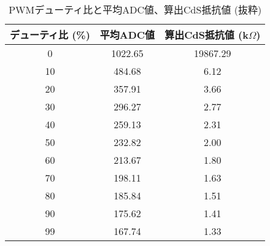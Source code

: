 \documentclass[a4paper,11pt,dvipdfmx]{jsarticle}
\begin{document}
\begin{table}[h!]
\centering
\caption{PWMデューティ比と平均ADC値、算出CdS抵抗値 (抜粋)}
\label{tab:results_excerpt}
\begin{tabular}{@{}ccc@{}}
\toprule
デューティ比 (\%) & 平均ADC値 & 算出CdS抵抗値 (k$\Omega$) \\ \midrule
0 & 1022.65 & 19867.29 \\
10 & 484.68 & 6.12 \\
20 & 357.91 & 3.66 \\
30 & 296.27 & 2.77 \\
40 & 259.13 & 2.31 \\
50 & 232.82 & 2.00 \\
60 & 213.67 & 1.80 \\
70 & 198.11 & 1.63 \\
80 & 185.84 & 1.51 \\
90 & 175.62 & 1.41 \\
99 & 167.74 & 1.33 \\ \bottomrule
\end{tabular}
\end{table}
\end{document}
